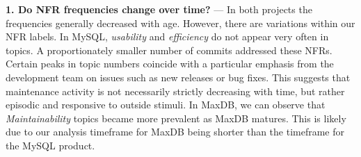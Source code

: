 \documentclass[]{sig-alternate}
\newcommand{\XXX}[1]{\textcolor{red}{{\it \textbf{[XXX: #1]}}}}
\begin{document}

\noindent\textbf{1. Do NFR frequencies change over time?} --- 
In both projects the frequencies generally decreased with age. 
However, there are variations within our NFR labels. In MySQL, \emph{usability} and \emph{efficiency} do not appear very often in topics. 
A proportionately smaller number of commits addressed these NFRs.
Certain peaks in topic numbers coincide with a particular emphasis from the development team on issues such as new releases or bug fixes.
This suggests that maintenance activity is not necessarily strictly decreasing with time, but rather episodic and responsive to outside stimuli. 
In MaxDB, we can observe that \emph{Maintainability} topics became more prevalent as MaxDB matures. 
This is likely due to our analysis timeframe for MaxDB being shorter than the timeframe for the MySQL product. 
\end{document}
